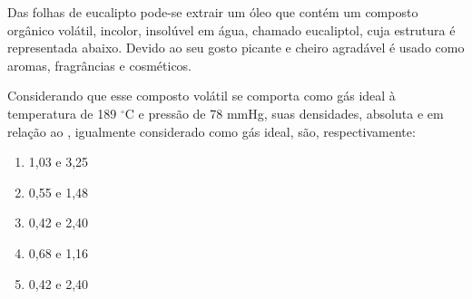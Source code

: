 Das folhas de eucalipto pode-se extrair um óleo que contém um composto orgânico volátil, incolor, insolúvel em água, chamado eucaliptol, cuja estrutura
é representada abaixo. Devido ao seu gosto picante e cheiro agradável é usado
como aromas, fragrâncias e cosméticos.

\begin{center}
\end{center}

Considerando que esse composto volátil se comporta como gás ideal à
temperatura de 189 $^\circ$C e pressão de 78 mmHg, suas densidades, absoluta e em
relação ao , igualmente considerado como gás ideal, são, respectivamente:

\begin{enumerate}[label = (\alph*)]
	\item 1,03 e 3,25
	\item 0,55 e 1,48
	\item 0,42 e 2,40
	\item 0,68 e 1,16
	\item 0,42 e 2,40
\end{enumerate}
